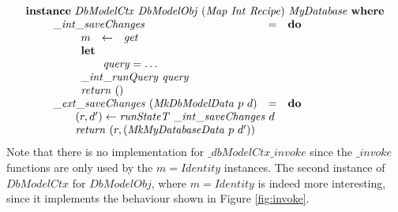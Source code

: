 \begin{displaymath}
\begin{array}{l}
\mathbf{instance}~\mathit{DbModelCtx}~\mathit{DbModelObj}~(\mathit{Map}~\mathit{Int}~\mathit{Recipe})~\mathit{MyDatabase}~\mathbf{where}\\
\qquad \begin{array}{lcl}
\mathit{\_int\_saveChanges} & = & \mathbf{do} \\
\multicolumn{3}{l}{\qquad \begin{array}{lcl}
    m & \leftarrow & \mathit{get} \\
    \multicolumn{3}{l}{\mathbf{let}} \\
    \multicolumn{3}{l}{\qquad \mathit{query} = \ldots} \\
    \multicolumn{3}{l}{\mathit{\_int\_runQuery}~\mathit{query}}\\
    \multicolumn{3}{l}{\mathit{return}~()}
\end{array} }\\
\mathit{\_ext\_saveChanges}~(\mathit{MkDbModelData}~p~d) & = & \mathbf{do} \\
\multicolumn{3}{l}{\qquad (r,d') \leftarrow \mathit{runStateT}~\mathit{\_int\_saveChanges}~d } \\ 
\multicolumn{3}{l}{\qquad \mathit{return}~(r, (\mathit{MkMyDatabaseData}~p~d')) } 
\end{array}
\end{array}
\end{displaymath}
Note that there is no implementation for $\_\mathit{dbModelCtx}\_\mathit{invoke}$ since the $\_\mathit{invoke}$ functions are only used by the $m = \mathit{Identity}$ instances. The second instance of $\mathit{DbModelCtx}$ for $\mathit{DbModelObj}$, where $m = \mathit{Identity}$ is indeed more interesting, since it implements the behaviour shown in Figure \ref{fig:invoke}.
